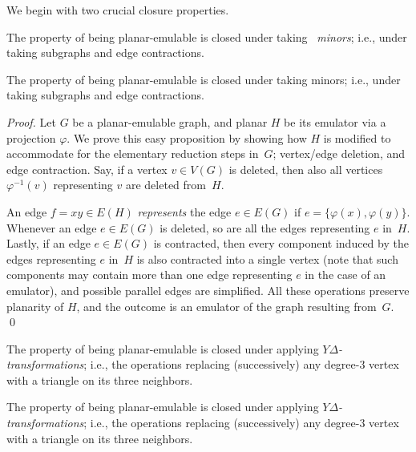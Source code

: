 \documentclass[envcountsect,envcountsame]{llncs}
\renewenvironment{accumulate}{}{}
\begin{document}
We begin with two crucial closure properties.

\begin{proposition}
\label{prop:clminor}
The property of being planar-emulable is closed under taking \mbox{\em
minors}; i.e., under taking subgraphs and edge contractions.
\end{proposition}
\begin{onlyaccum}
{\def\thetheorem{\ref{prop:clminor}}
\begin{proposition}
The property of being planar-emulable is closed under taking \mbox{minors}; 
i.e., under taking subgraphs and edge contractions.
\end{proposition}}
\end{onlyaccum}

\begin{accumulate}
\begin{proof}
Let $G$ be a planar-emulable graph, and planar $H$ be its emulator via a
projection $\varphi$.
We prove this easy proposition by showing how $H$ is modified to accommodate
for the elementary reduction steps in~$G$;
vertex/edge deletion, and edge contraction.
Say, if a vertex $v\in V(G)$ is deleted, then also all vertices
$\varphi^{-1}(v)$ representing $v$ are deleted from~$H$.

An edge $f=xy\in E(H)$ {\em represents} the edge $e\in E(G)$ if
$e=\{\varphi(x),\varphi(y)\}$.
Whenever an edge $e\in E(G)$ is deleted, so are all the edges 
representing $e$ in~$H$.
Lastly, if an edge $e\in E(G)$ is contracted,
then every component induced by the edges representing $e$ in~$H$ is also
contracted into a single vertex
(note that such components may contain more than one edge representing $e$
in the case of an emulator), and possible parallel edges are simplified.
All these operations preserve planarity of $H$,
and the outcome is an emulator of the graph resulting from~$G$.
\qed\end{proof}
\end{accumulate}


\begin{proposition}
\label{prop:clYDelta}
The property of being planar-emulable is closed under applying
\mbox{\em $Y\!\Delta$-transformations}; i.e., the operations replacing
(successively) any degree-$3$ vertex with a triangle on its three neighbors.
\end{proposition}
\begin{onlyaccum}
{\def\thetheorem{\ref{prop:clYDelta}}
\begin{proposition}
The property of being planar-emulable is closed under applying
\mbox{\em $Y\!\Delta$-transformations}; i.e., the operations replacing
(successively) any degree-$3$ vertex with a triangle on its three neighbors.
\end{proposition}}
\end{onlyaccum}
\end{document}
